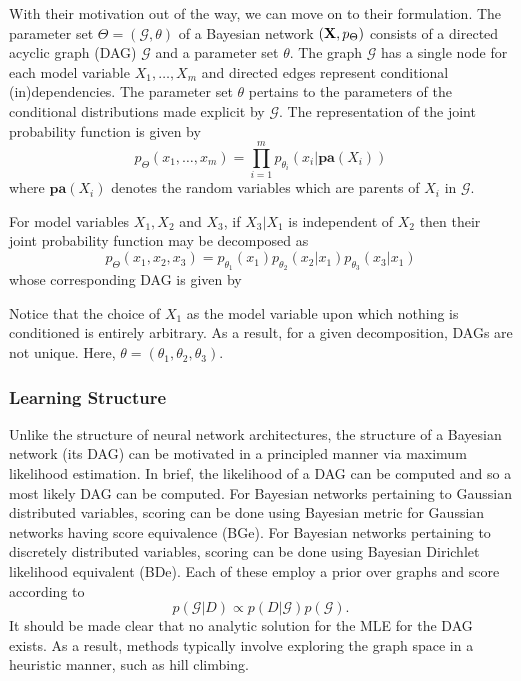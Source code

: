\documentclass[11pt]{article}
\begin{document}
With their motivation out of the way, we can move on to their formulation. The parameter set $\Theta=(\mathcal{G},\theta)$ of a Bayesian network $(\mathbf{X},p_\Theta)$ consists of a directed acyclic graph (DAG) $\mathcal{G}$ and a parameter set $\theta$. The graph $\mathcal{G}$ has a single node for each model variable $X_1,\dots,X_m$ and directed edges represent conditional (in)dependencies. The parameter set $\theta$ pertains to the parameters of the conditional distributions made explicit by $\mathcal{G}$. The representation of the joint probability function is given by
$$
p_{\Theta}(x_1,\dots,x_m)
=
\prod_{i=1}^m p_{\theta_i}(x_i|\textbf{pa}(X_i))
$$
where $\textbf{pa}(X_i)$ denotes the random variables which are parents of $X_i$ in $\mathcal{G}$.
\begin{example}
    For model variables $X_1, X_2$ and $X_3$, if $X_3|X_1$ is independent of $X_2$ then their joint probability function may be decomposed as
    $$
    p_{\Theta}(x_1,x_2,x_3)
    =
    p_{\theta_1}(x_1)p_{\theta_2}(x_2|x_1)p_{\theta_3}(x_3|x_1)
    $$
    whose corresponding DAG is given by
    \begin{center}
    \end{center}
    Notice that the choice of $X_1$ as the model variable upon which nothing is conditioned is entirely arbitrary. As a result, for a given decomposition, DAGs are not unique. Here, $\theta=(\theta_1,\theta_2,\theta_3)$.
\end{example}

\subsubsection{\TODO Learning Structure}
Unlike the structure of neural network architectures, the structure of a Bayesian network (its DAG) can be motivated in a principled manner via maximum likelihood estimation. In brief, the likelihood of a DAG can be computed and so a most likely DAG can be computed. For Bayesian networks pertaining to Gaussian distributed variables, scoring can be done using Bayesian metric for Gaussian networks having score equivalence (BGe). For Bayesian networks pertaining to discretely distributed variables, scoring can be done using Bayesian Dirichlet likelihood equivalent (BDe). Each of these employ a prior over graphs and score according to
$$
p(\mathcal{G}|D)
\propto
p(D|\mathcal{G})p(\mathcal{G}).
$$
It should be made clear that no analytic solution for the MLE for the DAG exists. As a result, methods typically involve exploring the graph space in a heuristic manner, such as hill climbing.
\end{document}
